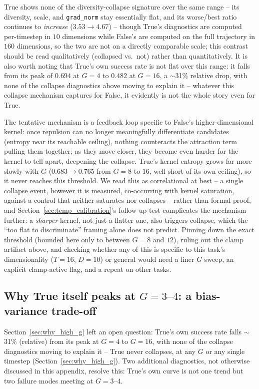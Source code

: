 \documentclass[11pt]{article}
\begin{document}
True shows none of the diversity-collapse signature over the same range
-- its diversity, scale, and \texttt{grad\_norm} stay essentially flat,
and its worse/best ratio continues to \emph{increase} ($3.53\to4.67$) --
though True's diagnostics are computed per-timestep in $10$ dimensions
while False's are computed on the full trajectory in $160$ dimensions, so
the two are not on a directly comparable scale; this contrast should be
read qualitatively (collapsed vs.\ not) rather than quantitatively. It is
also worth noting that True's own success rate is not flat over this
range: it falls from its peak of $0.694$ at $G=4$ to $0.482$ at $G=16$, a
$\sim$31\% relative drop, with none of the collapse diagnostics above
moving to explain it -- whatever this collapse mechanism captures for
False, it evidently is not the whole story even for True.

The tentative mechanism is a feedback loop specific to False's
higher-dimensional kernel: once repulsion can no longer meaningfully
differentiate candidates (entropy near its reachable ceiling), nothing
counteracts the attraction term pulling them together; as they move
closer, they become even harder for the kernel to tell apart, deepening
the collapse. True's kernel entropy grows far more slowly with $G$
($0.683\to0.765$ from $G=8$ to $16$, well short of its own ceiling), so it
never reaches this threshold. We read this as correlational at best -- a
single collapse event, however it is measured, co-occurring with kernel
saturation, against a control that neither saturates nor collapses --
rather than formal proof, and Section~\ref{sec:temp_calibration}'s
follow-up test complicates the mechanism further: a \emph{sharper}
kernel, not just a flatter one, also triggers collapse, which the
``too flat to discriminate'' framing alone does not predict. Pinning down
the exact threshold (bounded here only to between $G=8$ and $12$), ruling
out the clamp artifact above, and checking whether any of this is
specific to this task's dimensionality ($T=16$, $D=10$) or general would
need a finer $G$ sweep, an explicit clamp-active flag, and a repeat on
other tasks.

\subsection{Why True itself peaks at $G=3$--$4$: a bias-variance trade-off}
\label{sec:why_true_peaks}

Section~\ref{sec:why_high_g} left an open question: True's own success
rate falls $\sim$31\% (relative) from its peak at $G=4$ to $G=16$, with
none of the collapse diagnostics moving to explain it -- True never
collapses, at any $G$ or any single timestep (Section~\ref{sec:why_high_g}).
Two additional diagnostics, not otherwise discussed in this appendix,
resolve this: True's own curve is not one trend but two failure modes
meeting at $G=3$--$4$.
\end{document}
